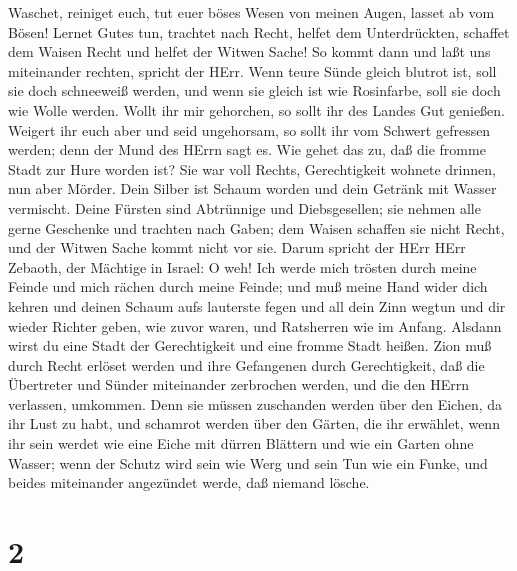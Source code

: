  Waschet, reiniget euch, tut euer böses Wesen von meinen
Augen, lasset ab vom Bösen!  Lernet Gutes tun, trachtet
nach Recht, helfet dem Unterdrückten, schaffet dem Waisen Recht und
helfet der Witwen Sache!  So kommt dann und laßt uns
miteinander rechten, spricht der HErr. Wenn teure Sünde gleich blutrot
ist, soll sie doch schneeweiß werden, und wenn sie gleich ist wie
Rosinfarbe, soll sie doch wie Wolle werden.  Wollt ihr mir
gehorchen, so sollt ihr des Landes Gut genießen.  Weigert
ihr euch aber und seid ungehorsam, so sollt ihr vom Schwert gefressen
werden; denn der Mund des HErrn sagt es.  Wie gehet das zu,
daß die fromme Stadt zur Hure worden ist? Sie war voll Rechts,
Gerechtigkeit wohnete drinnen, nun aber Mörder.  Dein
Silber ist Schaum worden und dein Getränk mit Wasser vermischt.
 Deine Fürsten sind Abtrünnige und Diebsgesellen; sie
nehmen alle gerne Geschenke und trachten nach Gaben; dem Waisen schaffen
sie nicht Recht, und der Witwen Sache kommt nicht vor sie. 
Darum spricht der HErr HErr Zebaoth, der Mächtige in Israel: O weh! Ich
werde mich trösten durch meine Feinde und mich rächen durch meine
Feinde;  und muß meine Hand wider dich kehren und deinen
Schaum aufs lauterste fegen und all dein Zinn wegtun  und
dir wieder Richter geben, wie zuvor waren, und Ratsherren wie im Anfang.
Alsdann wirst du eine Stadt der Gerechtigkeit und eine fromme Stadt
heißen.  Zion muß durch Recht erlöset werden und ihre
Gefangenen durch Gerechtigkeit,  daß die Übertreter und
Sünder miteinander zerbrochen werden, und die den HErrn verlassen,
umkommen.  Denn sie müssen zuschanden werden über den
Eichen, da ihr Lust zu habt, und schamrot werden über den Gärten, die
ihr erwählet,  wenn ihr sein werdet wie eine Eiche mit
dürren Blättern und wie ein Garten ohne Wasser;  wenn der
Schutz wird sein wie Werg und sein Tun wie ein Funke, und beides
miteinander angezündet werde, daß niemand lösche.

\hypertarget{section-1}{%
\section{2}\label{section-1}}

